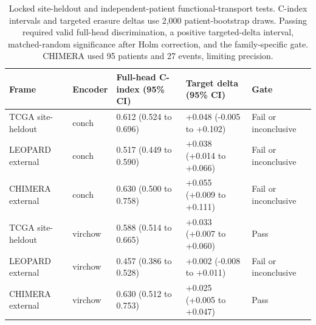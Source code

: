\begin{table}[H]
\centering
\scriptsize
\caption{Locked site-heldout and independent-patient functional-transport tests. C-index intervals and targeted erasure deltas use 2,000 patient-bootstrap draws. Passing required valid full-head discrimination, a positive targeted-delta interval, matched-random significance after Holm correction, and the family-specific gate. CHIMERA used 95 patients and 27 events, limiting precision.}
\label{tab:supp-functional-transport}
\begin{tabular}{@{}p{}p{}p{}p{}p{}@{}}
\toprule
Frame & Encoder & Full-head C-index (95\% CI) & Target delta (95\% CI) & Gate \\
\midrule
TCGA site-heldout & conch & 0.612 (0.524 to 0.696) & +0.048 (-0.005 to +0.102) & Fail or inconclusive \\
LEOPARD external & conch & 0.517 (0.449 to 0.590) & +0.038 (+0.014 to +0.066) & Fail or inconclusive \\
CHIMERA external & conch & 0.630 (0.500 to 0.758) & +0.055 (+0.009 to +0.111) & Fail or inconclusive \\
TCGA site-heldout & virchow & 0.588 (0.514 to 0.665) & +0.033 (+0.007 to +0.060) & Pass \\
LEOPARD external & virchow & 0.457 (0.386 to 0.528) & +0.002 (-0.008 to +0.011) & Fail or inconclusive \\
CHIMERA external & virchow & 0.630 (0.512 to 0.753) & +0.025 (+0.005 to +0.047) & Pass \\
\bottomrule
\end{tabular}
\end{table}
